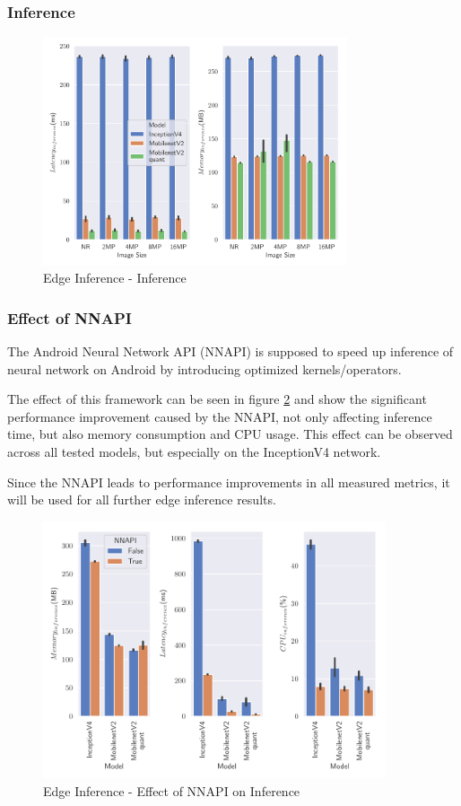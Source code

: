\subsubsection{Inference}
\begin{figure}[H]
\centering
\includegraphics[width=0.8\textwidth]{./Bilder/single_plots/edge_inference_plots/Edge_Inference_Inference.pdf}
\caption{Edge Inference - Inference}
\label{fig:EdgeInference}
\end{figure}
\subsubsection{Effect of NNAPI}
The Android Neural Network API (NNAPI) is supposed to speed up inference of neural network on Android by introducing optimized kernels/operators. 

The effect of this framework can be seen in figure \ref{fig:NNAPI} and show the significant performance improvement caused by the NNAPI, not only affecting inference time, but also memory consumption and CPU usage.
This effect can be observed across all tested models, but especially on the InceptionV4 network.


Since the NNAPI leads to performance improvements in all measured metrics, it will be used for all further edge inference results.
\begin{figure}[H]
\centering
\includegraphics[width=0.9\textwidth]{./Bilder/single_plots/edge_inference_plots/NNAPI_behavior.pdf}
\caption{Edge Inference - Effect of NNAPI on Inference}
\label{fig:NNAPI}
\end{figure}



